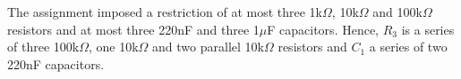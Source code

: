 The assignment imposed a restriction of at most three 1k$\Omega$, 10k$\Omega$ and 100k$\Omega$ resistors and at most three 220nF and three 1$\mu$F capacitors. Hence, $R_3$ is a series of three 100k$\Omega$, one 10k$\Omega$ and two parallel 10k$\Omega$ resistors and $C_1$ a series of two 220nF capacitors.


 
